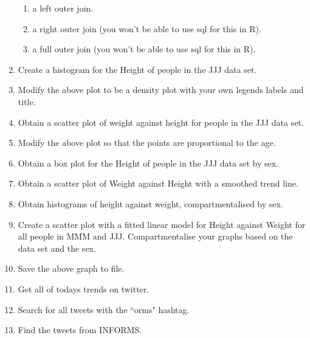\documentclass[12pt]{article}
\begin{document}
\begin{enumerate}
\begin{enumerate}
\item a left outer join.
\item a right outer join (you won't be able to use sql for this in R).
\item a full outer join (you won't be able to use sql for this in R).
\end{enumerate}
\item Create a histogram for the Height of people in the JJJ data set.
\item Modify the above plot to be a density plot with your own legends labels and title.
\item Obtain a scatter plot of weight against height for people in the JJJ data set.
\item Modify the above plot so that the points are proportional to the age.
\item Obtain a box plot for the Height of people in the JJJ data set by sex.
\item Obtain a scatter plot of Weight against Height with a smoothed trend line.
\item Obtain histograms of height against weight, compartmentalised by sex.
\item Create a scatter plot with a fitted linear model for Height against Weight for all people in MMM and JJJ. Compartmentalise your graphs based on the data set and the sex.
\item Save the above graph to file.
\item Get all of todays trends on twitter.
\item Search for all tweets with the ``orms" hashtag.
\item Find the tweets from INFORMS.
\end{enumerate}
\end{document}
